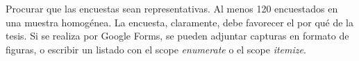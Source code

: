 
Procurar que las encuestas sean representativas. Al menos 120 encuestados en una muestra homogénea. La encuesta, claramente, debe favorecer el por qué de la tesis. Si se realiza por Google Forms, se pueden adjuntar capturas en formato de figuras, o escribir un listado con el scope \emph{enumerate} o el scope \emph{itemize}.